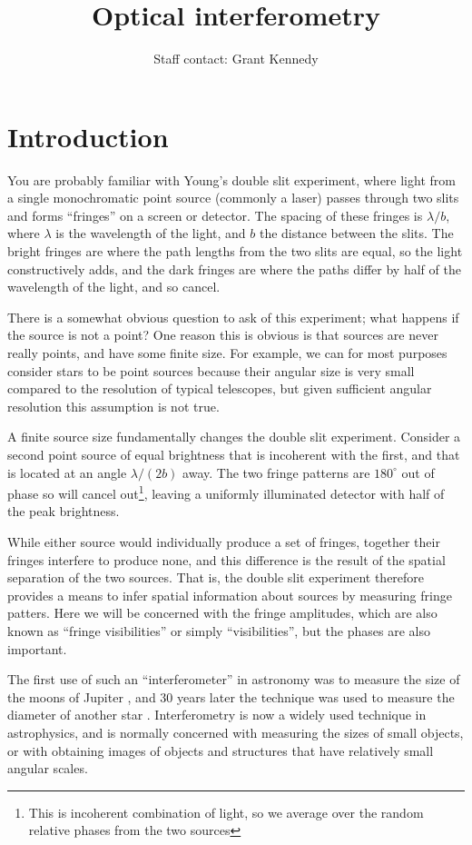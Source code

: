 \documentclass[11pt]{article}
\title{Optical interferometry}
\author{Staff contact: Grant Kennedy}
\begin{document}
\maketitle

\section{Introduction}

You are probably familiar with Young's double slit experiment, where light from a single monochromatic point source (commonly a laser) passes through two slits and forms ``fringes'' on a screen or detector. The spacing of these fringes is $\lambda/b$, where $\lambda$ is the wavelength of the light, and $b$ the distance between the slits. The bright fringes are where the path lengths from the two slits are equal, so the light constructively adds, and the dark fringes are where the paths differ by half of the wavelength of the light, and so cancel.

There is a somewhat obvious question to ask of this experiment; what happens if the source is not a point? One reason this is obvious is that sources are never really points, and have some finite size. For example, we can for most purposes consider stars to be point sources because their angular size is very small compared to the resolution of typical telescopes, but given sufficient angular resolution this assumption is not true.

A finite source size fundamentally changes the double slit experiment. Consider a second point source of equal brightness that is incoherent with the first, and that is located at an angle $\lambda/(2b)$ away. The two fringe patterns are $180^\circ$ out of phase so will cancel out\footnote{This is incoherent combination of light, so we average over the random relative phases from the two sources}, leaving a uniformly illuminated detector with half of the peak brightness.

While either source would individually produce a set of fringes, together their fringes interfere to produce none, and this difference is the result of the spatial separation of the two sources. That is, the double slit experiment therefore provides a means to infer spatial information about sources by measuring fringe patters. Here we will be concerned with the fringe amplitudes, which are also known as ``fringe visibilities'' or simply ``visibilities'', but the phases are also important.

The first use of such an ``interferometer'' in astronomy was to measure the size of the moons of Jupiter \citep{1891PASP....3..274M,1891Natur..45..160M}, and 30 years later the technique was used to measure the diameter of another star \citep{1921ApJ....53..249M}. Interferometry is now a widely used technique in astrophysics, and is normally concerned with measuring the sizes of small objects, or with obtaining images of objects and structures that have relatively small angular scales.
\end{document}
